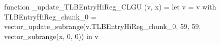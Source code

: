 function _update_TLBEntryHiReg_CLGU (v, x) = let v = { v with TLBEntryHiReg_chunk_0 = vector_update_subrange(v.TLBEntryHiReg_chunk_0, 59, 59, vector_subrange(x, 0, 0)) } in v
